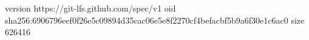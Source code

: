 version https://git-lfs.github.com/spec/v1
oid sha256:6906796eef0f26e5c09894d35cac06e5e8f2270cf4befacbf5b9a6f30e1c6ac0
size 626416

